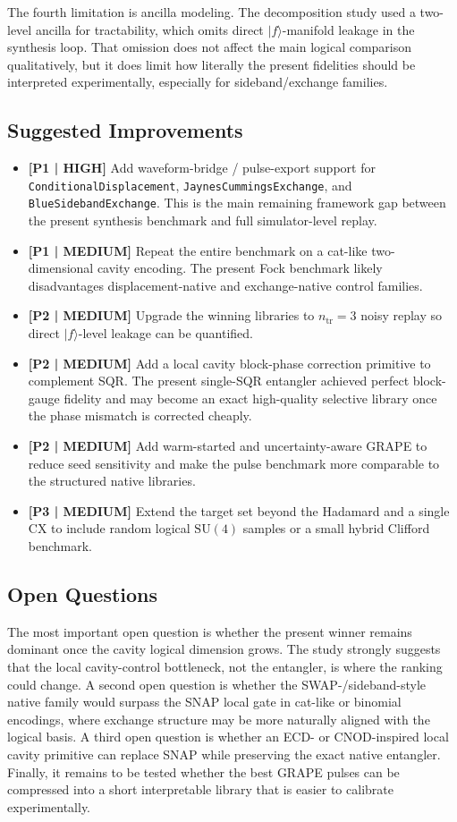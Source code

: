 \documentclass[11pt, a4paper]{article}
\begin{document}
The fourth limitation is ancilla modeling. The decomposition study used a
two-level ancilla for tractability, which omits direct \(|f\rangle\)-manifold
leakage in the synthesis loop. That omission does not affect the main logical
comparison qualitatively, but it does limit how literally the present fidelities
should be interpreted experimentally, especially for sideband/exchange families.

\subsection{Suggested Improvements}
\begin{itemize}
  \item \textbf{[P1 | HIGH]} Add waveform-bridge / pulse-export support for
  \texttt{ConditionalDisplacement}, \texttt{JaynesCummingsExchange}, and
  \texttt{BlueSidebandExchange}. This is the main remaining framework gap
  between the present synthesis benchmark and full simulator-level replay.
  \item \textbf{[P1 | MEDIUM]} Repeat the entire benchmark on a cat-like
  two-dimensional cavity encoding. The present Fock benchmark likely
  disadvantages displacement-native and exchange-native control families.
  \item \textbf{[P2 | MEDIUM]} Upgrade the winning libraries to
  \(n_{\mathrm{tr}}=3\) noisy replay so direct \(|f\rangle\)-level leakage can be
  quantified.
  \item \textbf{[P2 | MEDIUM]} Add a local cavity block-phase correction
  primitive to complement SQR. The present single-SQR entangler achieved perfect
  block-gauge fidelity and may become an exact high-quality selective library
  once the phase mismatch is corrected cheaply.
  \item \textbf{[P2 | MEDIUM]} Add warm-started and uncertainty-aware GRAPE to
  reduce seed sensitivity and make the pulse benchmark more comparable to the
  structured native libraries.
  \item \textbf{[P3 | MEDIUM]} Extend the target set beyond the Hadamard and a
  single \(\mathrm{CX}\) to include random logical \(\mathrm{SU}(4)\) samples or
  a small hybrid Clifford benchmark.
\end{itemize}

\subsection{Open Questions}
The most important open question is whether the present winner remains dominant
once the cavity logical dimension grows. The study strongly suggests that the
local cavity-control bottleneck, not the entangler, is where the ranking could
change. A second open question is whether the SWAP-/sideband-style native family
would surpass the SNAP local gate in cat-like or binomial encodings, where
exchange structure may be more naturally aligned with the logical basis. A third
open question is whether an ECD- or CNOD-inspired local cavity primitive can
replace SNAP while preserving the exact native entangler. Finally, it remains to
be tested whether the best GRAPE pulses can be compressed into a short
interpretable library that is easier to calibrate experimentally.



\end{document}

